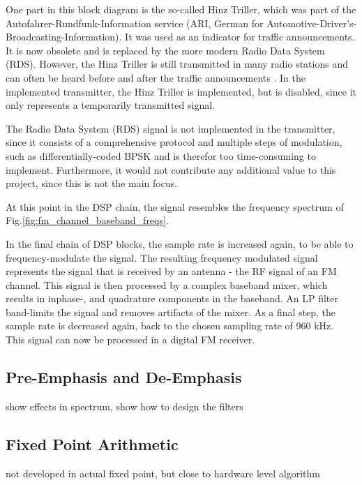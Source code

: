 One part in this block diagram is the so-called Hinz Triller, which was part of the Autofahrer-Rundfunk-Information service (ARI, German for Automotive-Driver's-Broadcasting-Information).
It was used as an indicator for traffic announcements.
It is now obsolete and is replaced by the more modern Radio Data System (RDS).
However, the Hinz Triller is still transmitted in many radio stations and can often be heard before and after the traffic announcements \cite{HinzTriller}.
In the implemented transmitter, the Hinz Triller is implemented, but is disabled, since it only represents a temporarily transmitted signal.

The Radio Data System (RDS) signal is not implemented in the transmitter, since it consists of a comprehensive protocol and multiple steps of modulation, such as differentially-coded BPSK \cite{IntroFmStereoRdsModulation} and is therefor too time-consuming to implement.
Furthermore, it would not contribute any additional value to this project, since this is not the main focus.

At this point in the DSP chain, the signal resembles the frequency spectrum of Fig.\ref{fig:fm_channel_baseband_freqs}.

In the final chain of DSP blocks, the sample rate is increased again, to be able to frequency-modulate the signal.
The resulting frequency modulated signal represents the signal that is received by an antenna - the RF signal of an FM channel.
This signal is then processed by a complex baseband mixer, which results in inphase-, and quadrature components in the baseband.
An LP filter band-limits the signal and removes artifacts of the mixer.
As a final step, the sample rate is decreased again, back to the chosen sampling rate of 960 kHz.\\

This signal can now be processed in a digital FM receiver.

\subsection{Pre-Emphasis and De-Emphasis}
show effects in spectrum, show how to design the filters

\subsection{Fixed Point Arithmetic}
not developed in actual fixed point, but close to hardware level algorithm





